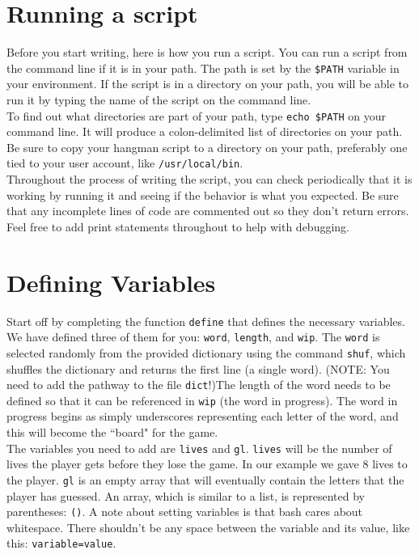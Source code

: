 \documentclass{article}
\begin{document}
\section*{Running a script}

\indent\indent Before you start writing, here is how you run a script. You can run a script from the command line if it is in your path. The path is set by the \verb|$PATH| variable in your environment. If the script is in a directory on your path, you will be able to run it by typing the name of the script on the command line. \\

To find out what directories are part of your path, type \verb|echo $PATH| on your command line. It  will produce a colon-delimited list of directories on your path. Be sure to copy your hangman script to a directory on your path, preferably one tied to your user account, like \verb|/usr/local/bin|. \\

Throughout the process of writing the script, you can check periodically that it is working by running it and seeing if the behavior is what you expected. Be sure that any incomplete lines of code are commented out so they don't return errors. Feel free to add print statements throughout to help with debugging.



\section*{Defining Variables}

\indent\indent Start off by completing the function \verb|define| that defines the necessary variables. We have defined three of them for you: \verb|word|, \verb|length|, and \verb|wip|. The \verb|word| is selected randomly from the provided dictionary using the command \verb|shuf|, which shuffles the dictionary and returns the first line (a single word). (NOTE: You need to add the pathway to the file \verb|dict|!)The length of the word needs to be defined so that it can be referenced in \verb|wip| (the word in progress). The word in progress begins as simply underscores representing each letter of the word, and this will become the ``board" for the game. \\

The variables you need to add are \verb|lives| and \verb|gl|. \verb|lives| will be the number of lives the player gets before they lose the game. In our example we gave 8 lives to the player. \verb|gl| is an empty array that will eventually contain the letters that the player has guessed. An array, which is similar to a list, is represented by parentheses: \verb|()|. A note about setting variables is that bash cares about whitespace. There shouldn't be any space between the variable and its value, like this: \verb|variable=value|. \\
\end{document}
